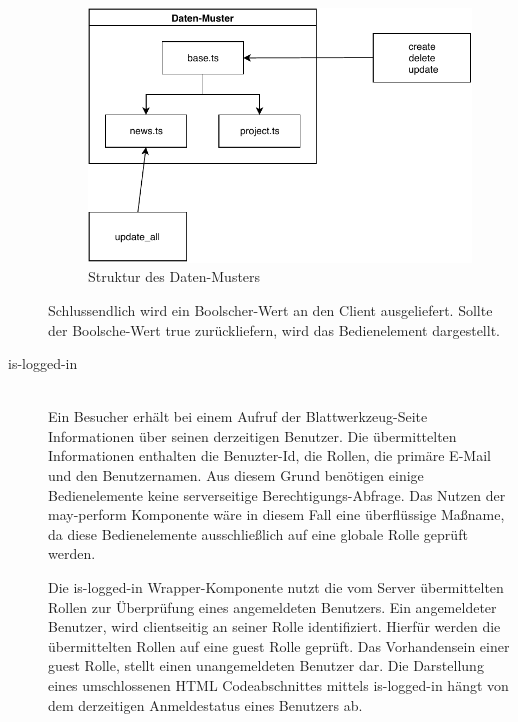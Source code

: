 \begin{description}
	\begin{figure}
		\centering
		\includegraphics[width=.8\textwidth]{graphics/data-pattern.pdf}
		\caption{Struktur des Daten-Musters}
		\label{fig:client-data-pattern}
        \end{figure}


	\begin{minipage}{\linewidth}
		
	\end{minipage}

	Schlussendlich wird ein Boolscher-Wert an den Client ausgeliefert. Sollte der Boolsche-Wert true zurückliefern, wird das Bedienelement dargestellt.

	\item[is-logged-in]\hfill\\
	Ein Besucher erhält  bei einem Aufruf der Blattwerkzeug-Seite Informationen über seinen derzeitigen Benutzer. Die übermittelten Informationen enthalten die Benuzter-Id, die Rollen, die primäre E-Mail und den Benutzernamen. Aus diesem Grund benötigen einige Bedienelemente keine serverseitige Berechtigungs-Abfrage. Das Nutzen  der may-perform Komponente wäre in diesem Fall eine überflüssige Ma{\ss}name, da diese Bedienelemente ausschlie{\ss}lich auf eine globale Rolle geprüft werden.

	Die is-logged-in Wrapper-Komponente nutzt die vom Server übermittelten Rollen zur Überprüfung eines angemeldeten Benutzers. Ein angemeldeter Benutzer, wird clientseitig an seiner Rolle identifiziert. Hierfür werden die übermittelten Rollen auf eine guest Rolle geprüft. Das Vorhandensein einer guest Rolle, stellt einen unangemeldeten Benutzer dar. Die Darstellung eines umschlossenen HTML Codeabschnittes mittels is-logged-in hängt von dem derzeitigen Anmeldestatus eines Benutzers ab.
\end{description}

